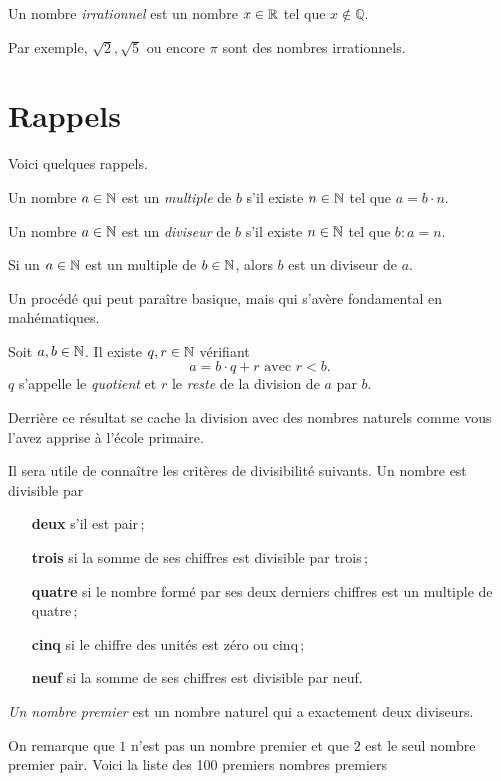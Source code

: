 \documentclass[a4paper,12pt]{report}
\begin{document}
\begin{defi}
Un nombre \emph{irrationnel} est un nombre $x\in \mathbb R$ tel que $x\not \in \mathbb Q$.
\end{defi}
 Par exemple, $\sqrt{2}, \sqrt{5}$ ou encore $\pi$ sont des nombres irrationnels.

\section{Rappels}
Voici quelques rappels. 

\begin{defi}[multiple]
	Un nombre $a\in \mathbb N$ est un \emph{multiple} de $b$ s'il existe $n\in \mathbb N$ tel que $a=b\cdot n$. 	
\end{defi}

\begin{defi}[diviseur]
	Un nombre $a\in \mathbb N$ est un \emph{diviseur} de $b$ s'il existe $n\in \mathbb N$ tel que $b: a=n$. 
\end{defi}
Si un $a\in \mathbb N$ est un multiple de $b\in \mathbb N$, alors $b$ est un diviseur de $a$.

Un procédé qui peut paraître basique, mais qui s'avère fondamental en mahématiques.

\begin{resultat}
	Soit $a, b\in \mathbb N$. Il existe $q,r\in \mathbb N$ vérifiant
	\[a=b\cdot q + r \text{ avec } r<b.\]
	$q$ s'appelle le \emph{quotient} et $r$ le \emph{reste} de la division de $a$ par $b$.
\end{resultat}
Derrière ce résultat se cache la division avec des nombres naturels comme vous l'avez apprise à l'école primaire.

Il sera utile de connaître les critères de divisibilité suivants.
Un nombre est divisible par
\begin{enumerate}[leftmargin=2cm]
	\item[{\bfseries deux}] s'il est pair\,;
	\item[{\bfseries trois}] si la somme de ses chiffres est divisible par trois\,;
	\item[{\bfseries quatre}] si le nombre formé par ses deux derniers chiffres est un multiple de quatre\,;
	\item[{\bfseries cinq}] si le chiffre des unités est zéro ou cinq\,;
	\item[{\bfseries neuf}] si la somme de ses chiffres est divisible par neuf.
\end{enumerate}
\begin{defi}
	\emph{Un nombre premier} est un nombre naturel qui a exactement deux diviseurs.
\end{defi}
On remarque que $1$ n'est pas un nombre premier et que $2$ est le seul nombre premier pair.
Voici la liste des 100 premiers nombres premiers
\end{document}
